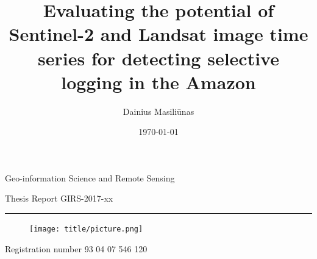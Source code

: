 \documentclass[a4paper,12pt]{scrbook}
\title{Evaluating the potential of Sentinel-2 and Landsat image time series for detecting selective logging in the Amazon}
\author{Dainius Masiliūnas}
\date{\today}
\begin{document}
 \begin{titlingpage}
  {\Large Geo-information Science and Remote Sensing}\vspace{0.9cm}
  
  {\Large Thesis Report GIRS-2017-xx}\vspace{0.9cm}
  
  \hrule\vspace{1.1cm}
  
  {\bfseries \Large \MakeUppercase{\thetitle}}\vspace{2.0cm}
  
  \begin{figure}
    \vspace{1cm}
    \texttt{[image: title/picture.png]}
  \end{figure}
  
  {\Large \theauthor}\vspace{6.0cm}
  
  \vspace{1.5cm}
  
  
  
  \thispagestyle{empty}
  
  \begin{center}
  {\bfseries \Large \thetitle}\vspace{2.7cm}
  
  {\Large \theauthor}\vspace{1.1cm}
  
  {Registration number 93 04 07 546 120}\vspace{3.5cm}
  

\end{center}
\end{titlingpage}
\end{document}
